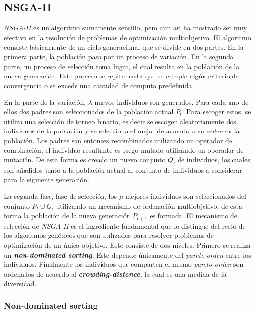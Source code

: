 \subsection{NSGA-II}

\emph{NSGA-II} es un algoritmo sumamente sencillo, pero aun así ha mostrado ser muy efectivo en la resolución de problemas de optimización multiobjetivo.
El algoritmo consiste básicamente de un ciclo generacional que se divide en dos partes.
En la primera parte, la población pasa por un proceso de variación.
En la segunda parte, un proceso de selección toma lugar, el cual resulta en la población de la nueva generación.
Este proceso se repite hasta que se cumple algún criterio de convergencia o se excede una cantidad de computo predefinida.

En la parte de la variación, $\lambda$ nuevos individuos son generados.
Para cada uno de ellos dos padres son seleccionados de la población actual $P_t$.
Para escoger estos, se utiliza una selección de torneo binario, es decir se escogen aleatoriamente dos individuos de la población y se selecciona el mejor de acuerdo a su \emph{orden} en la población.
Los padres son entonces recombinados utilizando un operador de combinación, el individuo resultante es luego mutado utilizando un operador de mutación.
De esta forma es creado un nuevo conjunto $Q_t$ de individuos, los cuales son añadidos junto a la población actual al conjunto de individuos a considerar para la siguiente generación.

La segunda fase, fase de selección, los $\mu$ mejores individuos son seleccionados del conjunto $P_t \cup Q_t$ utilizando un mecanismo de ordenación multiobjetivo, de esta forma la población de la nueva generación $P_{t+1}$ es formada.
El mecanismo de selección de \emph{NSGA-II} es el ingrediente fundamental que lo distingue del resto de los algoritmos genéticos que son utilizados para resolver problemas de optimización de un único objetivo.
Este consiste de dos niveles.
Primero se realiza un \emph{\textbf{non-dominated sorting}}.
Este depende únicamente del \emph{pareto-orden} entre los individuos.
Finalmente los individuos que comparten el mismo \emph{pareto-orden} son ordenados de acuerdo al \emph{\textbf{crowding-distance}}, la cual es una medida de la diversidad.


\subsubsection{Non-dominated sorting}\label{section:ndsorting}

